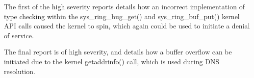 The first of the high severity reports\cite{zepCve2} details how an incorrect
implementation of type checking within the sys\_ring\_bug\_get() and
sys\_ring\_buf\_put() kernel API calls caused the kernel to spin, which again
could be used to initiate a denial of service\cite{zep2Git}.

The final report is of high severity\cite{zepCve3}, and details how a buffer
overflow can be initiated due to the kernel getaddrinfo() call, which is used
during DNS resolution\cite{zep3Git}.
